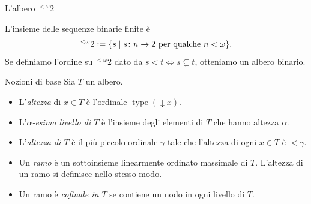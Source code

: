 \documentclass{beamer}
\theoremstyle{num.custom-title}
\theoremstyle{custom-title}
\DeclareMathOperator{\type}{type}
\DeclareMathOperator{\height}{height}
\DeclareMathOperator{\down}{\downarrow}
\newcommand*{\defeq}{\mathrel{\rlap{%
                     \raisebox{0.3ex}{$\cdot$}}%
                     \raisebox{-0.3ex}{$\cdot$}}%
                     =}
\renewcommand{\iff}{\Leftrightarrow}
\begin{document}
\begin{frame}{L'albero ${}^{< \omega} 2$}

L'insieme delle sequenze binarie finite è 
\[
{}^{< \omega} 2 \defeq \{s \mid s \colon n \to 2 \text{ per qualche } n < \omega\}.
\]
Se definiamo l'ordine su ${}^{< \omega} 2$ dato da $s < t \iff s \subsetneq t$, otteniamo un albero binario.


\end{frame}



\begin{frame}{Nozioni di base}
Sia $T$ un albero.
\begin{itemize}
\item L'\emph{altezza} di $x \in T$ è l'ordinale $\type(\down x)$.
\item L'\emph{$\alpha$-esimo livello di $T$} è l'insieme degli elementi di $T$ che hanno altezza $\alpha$.
\item L'\emph{altezza di $T$} è il più piccolo ordinale $\gamma$ tale che l'altezza di ogni $x \in T$ è $< \gamma$.
\item Un \emph{ramo} è un sottoinsieme linearmente ordinato massimale di $T$. L'altezza di un ramo si definisce nello stesso modo.
\item Un ramo è \emph{cofinale in $T$} se contiene un nodo in ogni livello di $T$.
\end{itemize}
\end{frame}
\end{document}

